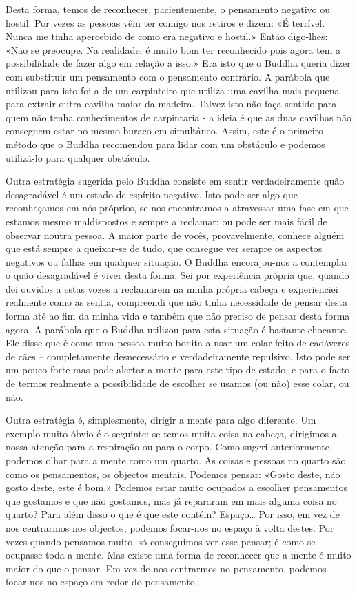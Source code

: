 Desta forma, temos de reconhecer, pacientemente, o pensamento negativo
ou hostil. Por vezes as pessoas vêm ter comigo nos retiros e dizem: «É
terrível. Nunca me tinha apercebido de como era negativo e hostil.»
Então digo-lhes: «Não se preocupe. Na realidade, é muito bom ter
reconhecido pois agora tem a possibilidade de fazer algo em relação a
isso.» Era isto que o Buddha queria dizer com substituir um pensamento
com o pensamento contrário. A parábola que utilizou para isto foi a de
um carpinteiro que utiliza uma cavilha mais pequena para extrair outra
cavilha maior da madeira. Talvez isto não faça sentido para quem não
tenha conhecimentos de carpintaria - a ideia é que as duas cavilhas não
conseguem estar no mesmo buraco em simultâneo. Assim, este é o primeiro
método que o Buddha recomendou para lidar com um obstáculo e podemos
utilizá-lo para qualquer obstáculo.

Outra estratégia sugerida pelo Buddha consiste em sentir verdadeiramente
quão desagradável é um estado de espírito negativo. Isto pode ser algo
que reconheçamos em nós próprios, se nos encontramos a atravessar uma
fase em que estamos mesmo maldispostos e sempre a reclamar; ou pode ser
mais fácil de observar noutra pessoa. A maior parte de vocês,
provavelmente, conhece alguém que está sempre a queixar-se de tudo, que
consegue ver sempre os aspectos negativos ou falhas em qualquer
situação. O Buddha encorajou-nos a contemplar o quão desagradável é
viver desta forma. Sei por experiência própria que, quando dei ouvidos a
estas vozes a reclamarem na minha própria cabeça e experienciei
realmente como as sentia, compreendi que não tinha necessidade de pensar
desta forma até ao fim da minha vida e também que não preciso de pensar
desta forma agora. A parábola que o Buddha utilizou para esta situação é
bastante chocante. Ele disse que é como uma pessoa muito bonita a usar
um colar feito de cadáveres de cães -- completamente desnecessário e
verdadeiramente repulsivo. Isto pode ser um pouco forte mas pode alertar
a mente para este tipo de estado, e para o facto de termos realmente a
possibilidade de escolher se usamos (ou não) esse colar, ou não.

Outra estratégia é, simplesmente, dirigir a mente para algo diferente.
Um exemplo muito óbvio é o seguinte: se temos muita coisa na cabeça,
dirigimos a nossa atenção para a respiração ou para o corpo. Como sugeri
anteriormente, podemos olhar para a mente como um quarto. As coisas e
pessoas no quarto são como os pensamentos, os objectos mentais. Podemos
pensar: «Gosto deste, não gosto deste, este é bom.» Podemos estar muito
ocupados a escolher pensamentos que gostamos e que não gostamos, mas já
repararam em mais alguma coisa no quarto? Para além disso o que é que
este contém? Espaço\ldots{} Por isso, em vez de nos centrarmos nos
objectos, podemos focar-nos no espaço à volta destes. Por vezes quando
pensamos muito, só conseguimos ver esse pensar; é como se ocupasse toda
a mente. Mas existe uma forma de reconhecer que a mente é muito maior do
que o pensar. Em vez de nos centrarmos no pensamento, podemos focar-nos
no espaço em redor do pensamento.

